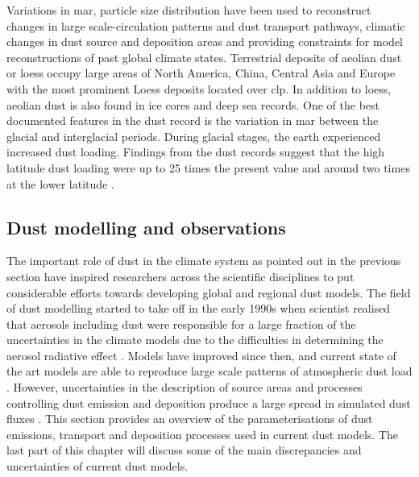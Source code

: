 Variations in \acrfull{mar}, particle size distribution have been used to reconstruct changes in large scale-circulation patterns and dust transport pathways, climatic changes in dust source and deposition areas and providing constraints for model reconstructions of past global climate states. Terrestrial deposits of aeolian dust or loess occupy large areas of North America, China, Central Asia and Europe with the most prominent Loess deposits located over \acrfull{clp}. In addition to loess, aeolian dust is also found in ice cores and deep sea records. One of the best documented features in the dust record is the variation in \acrfull{mar} between the glacial and interglacial periods. During glacial stages, the earth experienced increased dust loading. Findings from the dust records suggest that the high latitude dust loading were up to 25 times the present value and around two times at the lower latitude \parencite{shao2011dust}.     

       
\subsection{Dust modelling and observations}\label{sec:dust_modelling}

The important role of dust in the climate system as pointed out in the previous section have inspired researchers across the scientific disciplines to put considerable efforts towards developing global and regional dust models. The field of dust modelling started to take off in the early 1990s when scientist realised that aerosols including dust were responsible for a large fraction of the uncertainties in the climate models due to the difficulties in determining the aerosol radiative effect \parencite{tegen1996influence}. Models have improved since then, and current state of the art models are able to reproduce large scale patterns of atmospheric dust load . 
However, uncertainties in the description of
source areas and processes controlling dust emission and deposition produce a large spread in simulated dust fluxes \parencite{huneeus2011global}. This section provides an overview of the parameterisations of dust emissions, transport and deposition processes used in current dust models. The last part of this chapter will discuss some of the main discrepancies and uncertainties of current dust models.

